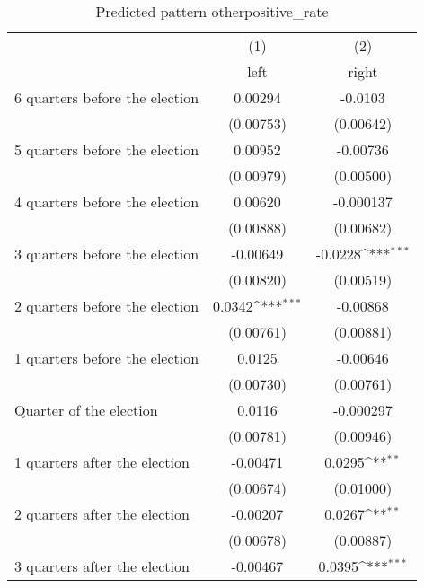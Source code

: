 \begin{table}[htbp]\centering
\def\sym#1{\ifmmode^{#1}\else\(^{#1}\)\fi}
\caption{Predicted pattern otherpositive\_rate}
\begin{tabular}{l*{2}{c}}
\hline\hline
                    &\multicolumn{1}{c}{(1)}&\multicolumn{1}{c}{(2)}\\
                    &\multicolumn{1}{c}{left}&\multicolumn{1}{c}{right}\\
\hline
 6 quarters before the election&     0.00294         &     -0.0103         \\
                    &   (0.00753)         &   (0.00642)         \\
[1em]
 5 quarters before the election&     0.00952         &    -0.00736         \\
                    &   (0.00979)         &   (0.00500)         \\
[1em]
 4 quarters before the election&     0.00620         &   -0.000137         \\
                    &   (0.00888)         &   (0.00682)         \\
[1em]
 3 quarters before the election&    -0.00649         &     -0.0228\sym{***}\\
                    &   (0.00820)         &   (0.00519)         \\
[1em]
 2 quarters before the election&      0.0342\sym{***}&    -0.00868         \\
                    &   (0.00761)         &   (0.00881)         \\
[1em]
 1 quarters before the election&      0.0125         &    -0.00646         \\
                    &   (0.00730)         &   (0.00761)         \\
[1em]
Quarter of the election&      0.0116         &   -0.000297         \\
                    &   (0.00781)         &   (0.00946)         \\
[1em]
 1 quarters after the election&    -0.00471         &      0.0295\sym{**} \\
                    &   (0.00674)         &   (0.01000)         \\
[1em]
 2 quarters after the election&    -0.00207         &      0.0267\sym{**} \\
                    &   (0.00678)         &   (0.00887)         \\
[1em]
 3 quarters after the election&    -0.00467         &      0.0395\sym{***}\\

\end{tabular}
\end{table}
